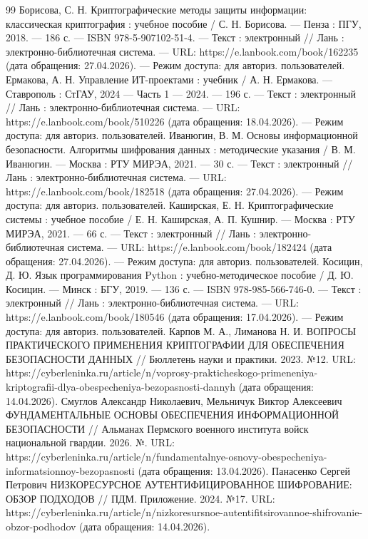 \documentclass[14pt, a4paper]{extarticle}
\begin{document}
\begin{thebibliography}{99}
	Борисова, С. Н. Криптографические методы защиты информации: классическая криптография : учебное пособие / С. Н. Борисова. — Пенза : ПГУ, 2018. — 186 с. — ISBN 978-5-907102-51-4. — Текст : электронный // Лань : электронно-библиотечная система. — URL: https://e.lanbook.com/book/162235 (дата обращения: 27.04.2026). — Режим доступа: для авториз. пользователей.
	Ермакова, А. Н. Управление ИТ-проектами : учебник / А. Н. Ермакова. — Ставрополь : СтГАУ, 2024 — Часть 1 — 2024. — 196 с. — Текст : электронный // Лань : электронно-библиотечная система. — URL: https://e.lanbook.com/book/510226 (дата обращения: 18.04.2026). — Режим доступа: для авториз. пользователей.
	Иванюгин, В. М. Основы информационной безопасности. Алгоритмы шифрования данных : методические указания / В. М. Иванюгин. — Москва : РТУ МИРЭА, 2021. — 30 с. — Текст : электронный // Лань : электронно-библиотечная система. — URL: https://e.lanbook.com/book/182518 (дата обращения: 27.04.2026). — Режим доступа: для авториз. пользователей.
	Каширская, Е. Н. Криптографические системы : учебное пособие / Е. Н. Каширская, А. П. Кушнир. — Москва : РТУ МИРЭА, 2021. — 66 с. — Текст : электронный // Лань : электронно-библиотечная система. — URL: https://e.lanbook.com/book/182424 (дата обращения: 27.04.2026). — Режим доступа: для авториз. пользователей.
	Косицин, Д. Ю. Язык программирования Python : учебно-методическое пособие / Д. Ю. Косицин. — Минск : БГУ, 2019. — 136 с. — ISBN 978-985-566-746-0. — Текст : электронный // Лань : электронно-библиотечная система. — URL: https://e.lanbook.com/book/180546 (дата обращения: 17.04.2026). — Режим доступа: для авториз. пользователей.
	Карпов М. А., Лиманова Н. И. ВОПРОСЫ ПРАКТИЧЕСКОГО ПРИМЕНЕНИЯ КРИПТОГРАФИИ ДЛЯ ОБЕСПЕЧЕНИЯ БЕЗОПАСНОСТИ ДАННЫХ // Бюллетень науки и практики. 2023. №12. URL: https://cyberleninka.ru/article/n/voprosy-prakticheskogo-primeneniya-kriptografii-dlya-obespecheniya-bezopasnosti-dannyh (дата обращения: 14.04.2026).
	Смуглов Александр Николаевич, Мельничук Виктор Алексеевич ФУНДАМЕНТАЛЬНЫЕ ОСНОВЫ ОБЕСПЕЧЕНИЯ ИНФОРМАЦИОННОЙ БЕЗОПАСНОСТИ // Альманах Пермского военного института войск национальной гвардии. 2026. №. URL: https://cyberleninka.ru/article/n/fundamentalnye-osnovy-obespecheniya-informatsionnoy-bezopasnosti (дата обращения: 13.04.2026).
	Панасенко Сергей Петрович НИЗКОРЕСУРСНОЕ АУТЕНТИФИЦИРОВАННОЕ ШИФРОВАНИЕ: ОБЗОР ПОДХОДОВ // ПДМ. Приложение. 2024. №17. URL: https://cyberleninka.ru/article/n/nizkoresursnoe-autentifitsirovannoe-shifrovanie-obzor-podhodov (дата обращения: 14.04.2026).

\end{thebibliography}
\end{document}
